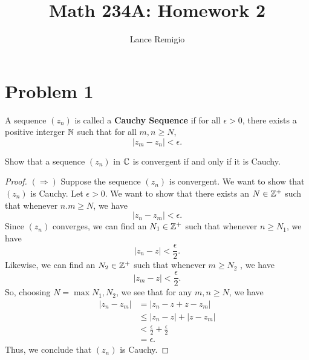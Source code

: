 \documentclass[a4paper]{article}
\title{Math 234A: Homework 2}
\author{Lance Remigio}
\begin{document}
   \maketitle 
 
\section{Problem 1} 
\begin{definition}
    A sequence \( ({z}_{n}) \) is called a \textbf{Cauchy Sequence} if for all \( \epsilon > 0  \), there exists a positive interger \( \mathbb{N}  \) such that for all \( m,n \geq N  \),   
    \[  | {z}_{m} - {z}_{n}  |  < \epsilon. \]
\end{definition}
Show that a sequence \( ({z}_{n}) \) in \( \mathbb{C}  \) is convergent if and only if it is Cauchy.
\begin{proof}
\( (\Rightarrow) \) Suppose the sequence \( ({z}_{n}) \) is convergent. We want to show that \( ({z}_{n}) \) is Cauchy. Let \( \epsilon > 0  \). We want to show that there exists an \( N \in \mathbb{Z}^{+} \) such that whenever \( n.m \geq N  \), we have
\[  | {z}_{n} - {z}_{m} | < \epsilon. \]
Since \( ({z}_{n}) \) converges, we can find an \( {N}_{1} \in \mathbb{Z}^{+} \) such that whenever \( n \geq {N}_{1} \), we have 
\[  | {z}_{n} - z  | < \frac{ \epsilon }{ 2 }. \tag{1} \]
Likewise, we can find an \( {N}_{2} \in \mathbb{Z}^{+} \) such that whenever \( m \geq {N}_{2} \) , we have 
\[  | {z}_{m} - z  |  < \frac{ \epsilon }{ 2 }. \tag{2} \]
So, choosing \( N = \max{{N}_{1}, {N}_{2}}  \), we see that for any \( m,n \geq N  \), we have 
\begin{align*}
    | {z}_{n} - {z}_{m} | &= | {z}_{n} - z + z - {z}_{m} |  \\
                          &\leq | {z}_{n} - z  |  + | z - {z}_{m} | \\
                          &< \frac{ \epsilon }{ 2 }  + \frac{ \epsilon }{ 2 }  \\
                          &= \epsilon.
\end{align*}
Thus, we conclude that \( ({z}_{n})  \) is Cauchy.


\end{proof}
\end{document}
